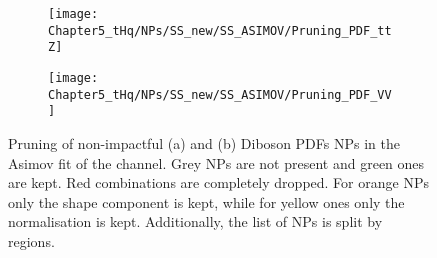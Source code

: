




\begin{figure}[h]
  \centering
  \begin{subfigure}{0.42\textwidth}
  \texttt{[image: Chapter5\_tHq/NPs/SS\_new/SS\_ASIMOV/Pruning\_PDF\_ttZ]} 
  \caption{}
  \end{subfigure}
  \begin{subfigure}{0.42\textwidth}
  \texttt{[image: Chapter5\_tHq/NPs/SS\_new/SS\_ASIMOV/Pruning\_PDF\_VV]}
  \caption{}
  \end{subfigure}
   \caption{Pruning of non-impactful (a) \ttZ and (b) Diboson PDFs NPs in the Asimov fit of the \dilepSStau channel. Grey NPs are 
   not present and green ones are kept. Red combinations are completely dropped. For orange NPs only the shape 
   component is kept, while for yellow ones only the normalisation is kept. Additionally, the list of NPs is split by regions.}
  \label{fig:Appendix:AdditionalResults:SS:Asimov:Pruning:ttZPDF}
\end{figure}

